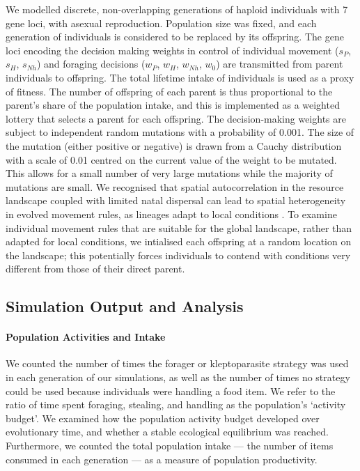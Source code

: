 \documentclass[11pt]{article}
\begin{document}
We modelled discrete, non-overlapping generations of haploid individuals with 7 gene loci, with asexual reproduction.
Population size was fixed, and each generation of individuals is considered to be replaced by its offspring.
The gene loci encoding the decision making weights in control of individual movement ($s_P$, $s_H$, $s_{Nh}$) and foraging decisions ($w_P$, $w_H$, $w_{Nh}$, $w_0$) are transmitted from parent individuals to offspring.
The total lifetime intake of individuals is used as a proxy of fitness.
The number of offspring of each parent is thus proportional to the parent's share of the population intake, and this is implemented as a weighted lottery that selects a parent for each offspring.
The decision-making weights are subject to independent random mutations with a probability of 0.001.
The size of the mutation (either positive or negative) is drawn from a Cauchy distribution with a scale of 0.01 centred on the current value of the weight to be mutated.
This allows for a small number of very large mutations while the majority of mutations are small.
We recognised that spatial autocorrelation in the resource landscape coupled with limited natal dispersal can lead to spatial heterogeneity in evolved movement rules, as lineages adapt to local conditions \citep[][]{wolf2010}.
To examine individual movement rules that are suitable for the global landscape, rather than adapted for local conditions, we intialised each offspring at a random location on the landscape; this potentially forces individuals to contend with conditions very different from those of their direct parent.

\subsection{Simulation Output and Analysis}

\paragraph{Population Activities and Intake}

We counted the number of times the forager or kleptoparasite strategy was used in each generation of our simulations, as well as the number of times no strategy could be used because individuals were handling a food item.
We refer to the ratio of time spent foraging, stealing, and handling as the population's `activity budget'.
We examined how the population activity budget developed over evolutionary time, and whether a stable ecological equilibrium was reached.
Furthermore, we counted the total population intake --- the number of items consumed in each generation --- as a measure of population productivity.
\end{document}
